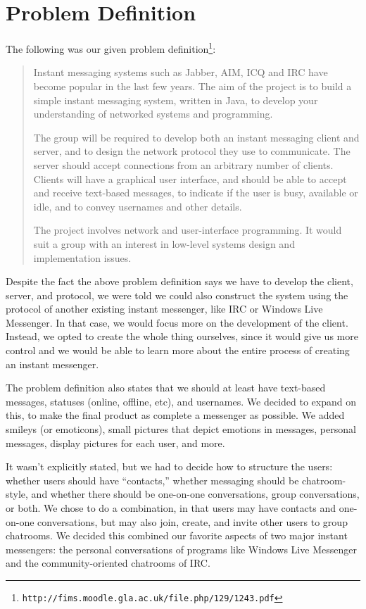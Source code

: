 \section{Problem Definition}
\label{probdef}
The following was our given problem definition\footnote{\texttt{http://fims.moodle.gla.ac.uk/file.php/129/1243.pdf}}:

\begin{quote}
Instant messaging systems such as Jabber, AIM, ICQ and IRC have become popular in the last few years. The aim of the project is to build a simple instant messaging system, written in Java, to develop your understanding of networked systems and programming.

The group will be required to develop both an instant messaging client and server, and to design the network protocol they use to communicate. The server should accept connections from an arbitrary number of clients. Clients will have a graphical user interface, and should be able to accept and receive text-based messages, to indicate if the user is busy, available or idle, and to convey usernames and other details.

The project involves network and user-interface programming. It would suit a group with an interest in low-level systems design and implementation issues.
\end{quote}

Despite the fact the above problem definition says we have to develop the client, server, and protocol, we were told we could also construct the system using the protocol of another existing instant messenger, like IRC or Windows Live Messenger. In that case, we would focus more on the development of the client. Instead, we opted to create the whole thing ourselves, since it would give us more control and we would be able to learn more about the entire process of creating an instant messenger.

The problem definition also states that we should at least have text-based messages, statuses (online, offline, etc), and usernames. We decided to expand on this, to make the final product as complete a messenger as possible. We added smileys (or emoticons), small pictures that depict emotions in messages, personal messages, display pictures for each user, and more.

It wasn't explicitly stated, but we had to decide how to structure the users: whether users should have ``contacts,'' whether messaging should be chatroom-style, and whether there should be one-on-one conversations, group conversations, or both. We chose to do a combination, in that users may have contacts and one-on-one conversations, but may also join, create, and invite other users to group chatrooms. We decided this combined our favorite aspects of two major instant messengers: the personal conversations of programs like Windows Live Messenger and the community-oriented chatrooms of IRC.

